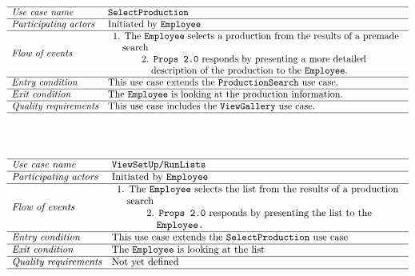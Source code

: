 \documentclass[12pt]{article}
\begin{document}
\\\\
\[
\begin{array}{ll}
\hline
\textit{Use case name} & \texttt{SelectProduction} \\
\hline
\textit{Participating actors} & \text{Initiated by \texttt{Employee}} \\
\hline
\textit{Flow of events} & 
\begin{array}{l}
\text{1. The \texttt{Employee} selects a production from the results of a premade}\\ \quad \text{search}\\
\quad \quad \quad \text{2. \texttt{Props 2.0} responds by presenting a more detailed}\\
\quad \quad \quad \quad \text{description of the production to the \texttt{Employee}.}
\end{array} \\
\hline
\textit{Entry condition} &
\text{This use case extends the \texttt{ProductionSearch} use case.}\\
\hline
\textit{Exit condition} & \text{The \texttt{Employee} is looking at the production information.} \\
\hline
\textit{Quality requirements} & \text{This use case includes the \texttt{ViewGallery} use case.} \\
\hline
\end{array}
\]
\\\\
\[
\begin{array}{ll}
\hline
\textit{Use case name} & \texttt{ViewSetUp/RunLists} \\
\hline
\textit{Participating actors} & \text{Initiated by \texttt{Employee}} \\
\hline
\textit{Flow of events} & 
\begin{array}{l}
\text{1. The \texttt{Employee} selects the list from the results of a production} \\ \quad \text{search} \\
\quad \quad \quad \text{2. \texttt{Props 2.0} responds by presenting the list to the}\\ \quad \quad \quad \quad \texttt{Employee.}
\end{array} \\
\hline
\textit{Entry condition} & \text{This use case extends the  \texttt{SelectProduction} use case} \\
\hline
\textit{Exit condition} & \text{The \texttt{Employee} is looking at the list} \\
\hline
\textit{Quality requirements} & \text{Not yet defined} \\
\hline
\end{array}
\]
\end{document}
